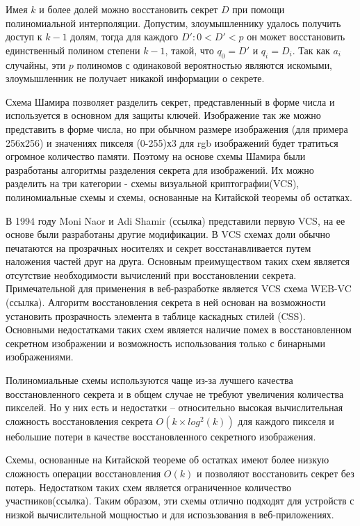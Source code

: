 \documentclass[a4paper,article,14pt]{extarticle}
\begin{document}
Имея $k$ и более долей можно восстановить секрет $D$ при помощи полиномиальной интерполяции.
Допустим, злоумышленнику удалось получить доступ к $k-1$ долям, тогда для каждого $D': 0<D'<p$ он может восстановить единственный полином степени $k-1$, такой, что $q_0=D'$ и 
$q_i=D_i$. Так как $a_i$ случайны, эти $p$ полиномов с одинаковой вероятностью являются искомыми, злоумышленник не получает никакой
информации о секрете. 

Схема Шамира позволяет разделить секрет, представленный в форме числа и используется в основном для защиты ключей. Изображение так же 
можно представить в форме числа, но при обычном размере изображения (для примера 256х256) и значениях пикселя (0-255)х3 для rgb изображений
будет тратиться огромное количество памяти. Поэтому на основе схемы Шамира были разработаны алгоритмы разделения секрета для изображений. 
Их можно разделить на три категории - схемы визуальной криптографии(VCS), полиномиальные схемы и схемы, основанные на Китайской теоремы об остатках. 

В 1994 году Moni Naor и Adi Shamir (ссылка) представили первую VCS, на ее основе были разработаны другие модификации.
В VCS схемах доли обычно печатаются на прозрачных носителях и секрет восстанавливается путем наложения частей друг на друга. 
Основным преимуществом таких схем является отсутствие необходимости вычислений при восстановлении секрета.
Примечательной для применения в веб-разработке является VCS схема WEB-VC (ссылка). Алгоритм восстановления секрета в ней основан 
на возможности установить прозрачность элемента в таблице каскадных стилей (CSS). Основными недостатками таких схем является 
наличие помех в восстановленном секретном изображении и возможность использования только с бинарными изображениями.

Полиномиальные схемы используются чаще из-за лучшего качества восстановленного секрета и в общем случае 
не требуют увеличения количества пикселей. Но у них есть и недостатки -- относительно высокая вычислительная сложность 
восстановления секрета $O(k \times log^2(k))$ для каждого пикселя и небольшие потери в качестве восстановленного секретного изображения.

Схемы, основанные на Китайской теореме об остатках имеют более низкую сложность операции восстановления $O(k)$ и позволяют 
восстановить секрет без потерь. Недостатком таких схем является ограниченное количество участников(ссылка). Таким образом, 
эти схемы отлично подходят для устройств с низкой вычислительной мощностью и для испозьзования в веб-приложениях.
\end{document}

